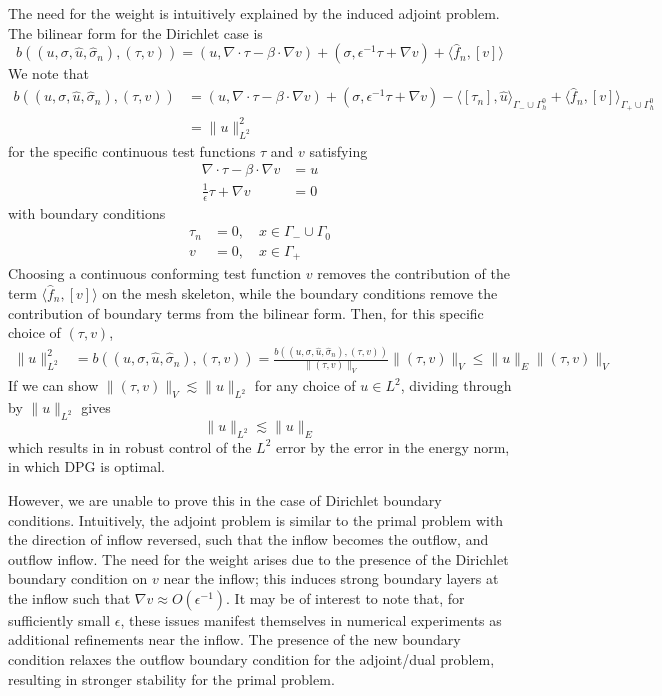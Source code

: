 \documentclass[11pt,onecolumn]{scrartcl}
\newcommand{\grad}{\nabla}
\renewcommand{\div}{\grad \cdot}
\begin{document}
The need for the weight is intuitively explained by the induced adjoint problem.  The bilinear form for the Dirichlet case is 
\[
b\left(\left(u,\sigma, \widehat{u}, \widehat{\sigma}_n\right), \left(\tau, v\right)\right) = \left(u,\div \tau - \beta \cdot \grad v\right) + \left(\sigma, \epsilon^{-1} \tau + \grad v\right) + \langle \widehat{f}_n, \left[v\right] \rangle
\]
We note that 
\begin{align*}
b\left(\left(u,\sigma, \widehat{u}, \widehat{\sigma}_n\right), \left(\tau, v\right)\right) &= \left(u,\div \tau - \beta \cdot \grad v\right) + \left(\sigma, \epsilon^{-1} \tau + \grad v\right) - \langle \left[\tau_n\right], \widehat{u} \rangle_{\Gamma_-\cup \Gamma_h^0} + \langle \widehat{f}_n, \left[v\right] \rangle_{\Gamma_+ \cup \Gamma_h^0} \\
&= \| u \|^2_{L^2}
\end{align*}
for the specific continuous test functions $\tau$ and $v$ satisfying
\begin{align*}
\div \tau - \beta \cdot \grad v &= u \\
\frac{1}{\epsilon}\tau + \grad v &= 0
\end{align*}
with boundary conditions
\begin{align}
\tau_n &= 0, \quad x\in \Gamma_-\cup \Gamma_0 \label{eq:adj_bc1}\\
v &= 0, \quad x\in \Gamma_+ \label{eq:adj_bc2}
\end{align}
Choosing a continuous conforming test function $v$ removes the contribution of the term $\langle \widehat{f}_n, \left[v\right] \rangle$ on the mesh skeleton, while the boundary conditions remove the contribution of boundary terms from the bilinear form.  Then, for this specific choice of $\left(\tau, v\right)$, 
\begin{align*}
\|u\|_{L^2}^2 &= b\left(\left(u,\sigma, \widehat{u}, \widehat{\sigma}_n\right), \left(\tau, v\right)\right) = \frac{b\left(\left(u,\sigma, \widehat{u}, \widehat{\sigma}_n\right), \left(\tau, v\right)\right)}{\|\left(\tau, v\right)\|_V}\|\left(\tau, v\right)\|_V \leq \|u\|_E \|\left(\tau, v\right)\|_V
\end{align*}
If we can show $\|\left(\tau, v\right)\|_V \lesssim \| u \|_{L^2}$ for any choice of $u \in L^2$, dividing through by $\|u\|_{L^2}$ gives
\[
\|u\|_{L^2} \lesssim \|u\|_E
\]
which results in in robust control of the $L^2$ error by the error in the energy norm, in which DPG is optimal. 

However, we are unable to prove this in the case of Dirichlet boundary conditions. Intuitively, the adjoint problem is similar to the primal problem with the direction of inflow reversed, such that the inflow becomes the outflow, and outflow inflow.  The need for the weight arises due to the presence of the Dirichlet boundary condition on $v$ near the inflow; this induces strong boundary layers at the inflow such that $\grad v \approx O(\epsilon^{-1})$. It may be of interest to note that, for sufficiently small $\epsilon$, these issues manifest themselves in numerical experiments as additional refinements near the inflow.  The presence of the new boundary condition relaxes the outflow boundary condition for the adjoint/dual problem, resulting in stronger stability for the primal problem.  
\end{document}
